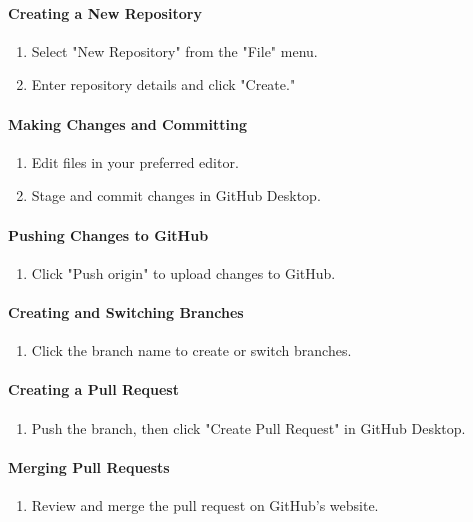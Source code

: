 \paragraph{Creating a New Repository}
\begin{enumerate}
    \item Select "New Repository" from the "File" menu.
    \item Enter repository details and click "Create."
\end{enumerate}

\paragraph{Making Changes and Committing}
\begin{enumerate}
    \item Edit files in your preferred editor.
    \item Stage and commit changes in GitHub Desktop.
\end{enumerate}

\paragraph{Pushing Changes to GitHub}
\begin{enumerate}
    \item Click "Push origin" to upload changes to GitHub.
\end{enumerate}

\paragraph{Creating and Switching Branches}
\begin{enumerate}
    \item Click the branch name to create or switch branches.
\end{enumerate}

\paragraph{Creating a Pull Request}
\begin{enumerate}
    \item Push the branch, then click "Create Pull Request" in GitHub Desktop.
\end{enumerate}

\paragraph{Merging Pull Requests}
\begin{enumerate}
    \item Review and merge the pull request on GitHub’s website.
\end{enumerate}

